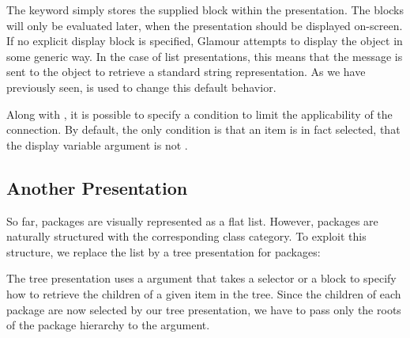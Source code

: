 \documentclass[a4paper,10pt,twoside]{book}
\begin{document}
The  keyword simply stores the supplied block within the
presentation. The blocks will only be evaluated later, when the
presentation should be displayed on-screen. If no explicit display
block is specified, Glamour attempts to display the object in some
generic way. In the case of list presentations, this means that the
 message is sent to the object to retrieve a
standard string representation. As we have previously seen,  is used to change
this default behavior.

Along with , it is possible to specify a 
condition to limit the applicability of the connection. By default,
the only condition is that an item is in fact selected, \ie{} that the
display variable argument is not .

\subsection{Another Presentation}
So far, packages are visually represented as a flat list. However, packages are naturally structured with the corresponding class category. To
exploit this structure, we replace the list by a tree presentation for packages:



The tree presentation uses a  argument that takes a
selector or a block to specify how to retrieve the children of a
given item in the tree. Since the children of each package are now
selected by our tree presentation, we have to pass only the roots of
the package hierarchy to the  argument.
\end{document}
